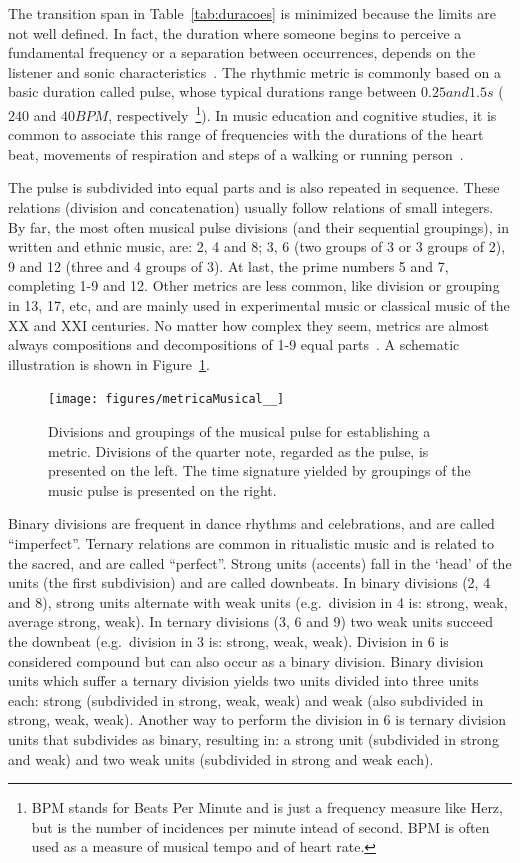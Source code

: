 The transition span in Table~\ref{tab:duracoes} is minimized because the limits
are not well defined. In fact, the duration where someone begins to perceive a
fundamental frequency or a separation between occurrences, depends on the
listener and sonic characteristics~\cite{microsound,Roederer}. The rhythmic metric is commonly based on a basic duration called pulse, whose typical durations range between $0.25 and 1.5s$ ($240$
and $40 BPM$, respectively~\footnote{BPM stands for Beats Per Minute and is just a frequency measure like Herz, but is the number of incidences per minute intead of second. BPM is often used as a measure of musical tempo and of heart rate.}). In music education and cognitive studies, it is common to associate this range of frequencies with the durations of the heart beat, movements of respiration and steps of a walking or running person~\cite{Lacerda,Roederer}.

The pulse is subdivided into equal parts and is also repeated in sequence. These relations (division and concatenation) usually follow relations of small
integers. By far, the most often musical pulse divisions (and their sequential groupings), in written and ethnic
music, are: 2, 4 and 8; 3, 6 (two groups of 3 or 3 groups of 2), 9 and 12 (three and 4 groups of 3). At last, the prime numbers 5 and 7, completing
1-9 and 12. Other metrics are less common, like division or grouping in 13, 17, etc, and are mainly used in experimental music or classical music of the XX and XXI centuries. No matter how complex they seem, metrics are almost always compositions and decompositions of 1-9 equal parts~\cite{Gramani,Roederer}.
A schematic illustration is shown in Figure~\ref{fig:pulsoSubAgl}.

\begin{figure}
    \centering
        \texttt{[image: figures/metricaMusical\_\_]}
    \caption{Divisions and groupings of the musical pulse for establishing a metric. Divisions of the quarter note, regarded as the
        pulse, is presented on the left. The time signature yielded by
        groupings of the music pulse is presented on the right.}
        \label{fig:pulsoSubAgl}
\end{figure}

Binary divisions are frequent in dance rhythms and celebrations, and are called ``imperfect''. Ternary relations are common in
ritualistic music and is related to the sacred, and are called ``perfect''. Strong units (accents) fall in the `head' of the units (the first subdivision) and are called downbeats. In binary divisions (2, 4
and 8), strong units alternate with weak units
(e.g.\ division in 4 is: strong, weak, average strong, weak). In ternary divisions
(3, 6 and 9) two weak units succeed the downbeat (e.g.\ division in 3 is:
strong, weak, weak). Division in 6 is considered compound but can also
occur as a binary division. Binary division units which suffer a ternary division yields two units divided into three units each: strong (subdivided in strong,
weak, weak) and weak (also subdivided in strong, weak, weak). Another way to perform
the division in 6 is ternary division units that subdivides as binary,
resulting in: a strong unit (subdivided in strong and weak) and two weak units
(subdivided in strong and weak each).


